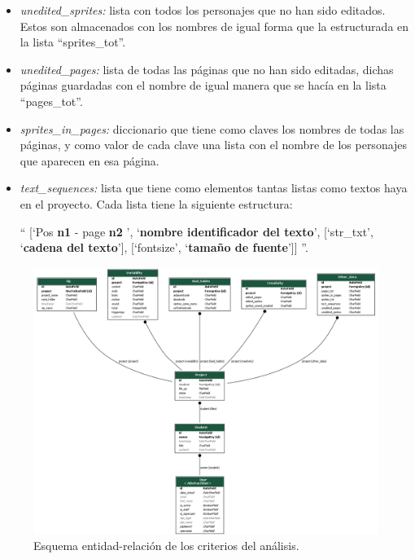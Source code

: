 \documentclass[a4paper, 12pt]{book}
\begin{document}
\begin{itemize}
\begin{itemize}
        \item \emph{unedited\_sprites:} lista con todos los personajes que no han sido editados.
        Estos son almacenados con los nombres de igual forma que la estructurada en la lista ``sprites\_tot''.

        \item \emph{unedited\_pages:} lista de todas las páginas que no han sido editadas, dichas páginas guardadas con el nombre de igual manera que se hacía en la lista ``pages\_tot''.

        \item \emph{sprites\_in\_pages:} diccionario que tiene como claves los nombres de todas las páginas, y como valor de cada clave una lista con el nombre de los personajes que aparecen en esa página.

        \item \emph{text\_sequences:} lista que tiene como elementos tantas listas como textos haya en el proyecto.
        Cada lista tiene la siguiente estructura:
         \begin{center}
            `` [`Pos \textbf{n1} - page \textbf{n2} ', `\textbf{nombre identificador del texto}', [`str\_txt', `\textbf{cadena del texto}'], [`fontsize', `\textbf{tamaño de fuente}']] ''.
         \end{center}
     \end{itemize}
\end{itemize}

\newpage

\begin{figure}[H]
  \centering
  \includegraphics[width=16cm, keepaspectratio]{img/entidad-relacion.png}
  \caption{Esquema entidad-relación de los criterios del análisis.}\label{fig:bd_criterios}
\end{figure}
\end{document}
